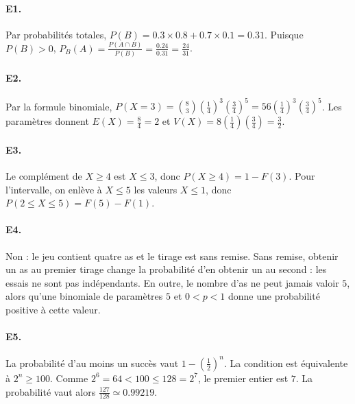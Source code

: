 \paragraph{E1.}Par probabilités totales, $P(B)=\num{0,3}\times\num{0,8}+\num{0,7}\times\num{0,1}=\num{0,31}$. Puisque $P(B)>0$, $P_B(A)=\frac{P(A\cap B)}{P(B)}=\frac{\num{0,24}}{\num{0,31}}=\frac{24}{31}$.

\paragraph{E2.}Par la formule binomiale, $P(X=3)=\binom{8}{3}(\frac{1}{4})^3(\frac{3}{4})^5=56(\frac{1}{4})^3(\frac{3}{4})^5$. Les paramètres donnent $E(X)=\frac{8}{4}=2$ et $V(X)=8(\frac{1}{4})(\frac{3}{4})=\frac{3}{2}$.

\paragraph{E3.}Le complément de $X\ge4$ est $X\le3$, donc $P(X\ge4)=1-F(3)$. Pour l'intervalle, on enlève à $X\le5$ les valeurs $X\le1$, donc $P(2\le X\le5)=F(5)-F(1)$.

\paragraph{E4.}Non : le jeu contient quatre as et le tirage est sans remise. Sans remise, obtenir un as au premier tirage change la probabilité d'en obtenir un au second : les essais ne sont pas indépendants. En outre, le nombre d'as ne peut jamais valoir $5$, alors qu'une binomiale de paramètres $5$ et $0<p<1$ donne une probabilité positive à cette valeur.

\paragraph{E5.}La probabilité d'au moins un succès vaut $1-(\frac{1}{2})^n$. La condition est équivalente à $2^n\ge100$. Comme $2^6=64<100\le128=2^7$, le premier entier est $7$. La probabilité vaut alors $\frac{127}{128}\simeq\num{0,99219}$.

